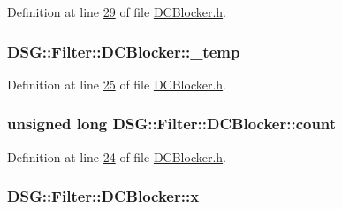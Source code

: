 Definition at line \hyperlink{_d_c_blocker_8h_source_l00029}{29} of file \hyperlink{_d_c_blocker_8h_source}{D\+C\+Blocker.\+h}.

\hypertarget{class_d_s_g_1_1_filter_1_1_d_c_blocker_a4a698e11be27e8613f5b5146df9c4599}{
\subsubsection[{\+\_\+temp}]{ D\+S\+G\+::\+Filter\+::\+D\+C\+Blocker\+::\+\_\+temp\hspace{0.3cm}{\ttfamily [protected]}}}\label{class_d_s_g_1_1_filter_1_1_d_c_blocker_a4a698e11be27e8613f5b5146df9c4599}


Definition at line \hyperlink{_d_c_blocker_8h_source_l00025}{25} of file \hyperlink{_d_c_blocker_8h_source}{D\+C\+Blocker.\+h}.

\hypertarget{class_d_s_g_1_1_filter_1_1_d_c_blocker_a2a045707b5b79e7a4330c87156f7b344}{
\subsubsection[{count}]{\setlength{\rightskip}{0pt plus 5cm}unsigned long D\+S\+G\+::\+Filter\+::\+D\+C\+Blocker\+::count\hspace{0.3cm}{\ttfamily [protected]}}}\label{class_d_s_g_1_1_filter_1_1_d_c_blocker_a2a045707b5b79e7a4330c87156f7b344}


Definition at line \hyperlink{_d_c_blocker_8h_source_l00024}{24} of file \hyperlink{_d_c_blocker_8h_source}{D\+C\+Blocker.\+h}.

\hypertarget{class_d_s_g_1_1_filter_1_1_d_c_blocker_aacb82cec9c34b8afe19fe2c7830eb05a}{
\subsubsection[{x}]{ D\+S\+G\+::\+Filter\+::\+D\+C\+Blocker\+::x\hspace{0.3cm}{\ttfamily [protected]}}}\label{class_d_s_g_1_1_filter_1_1_d_c_blocker_aacb82cec9c34b8afe19fe2c7830eb05a}


